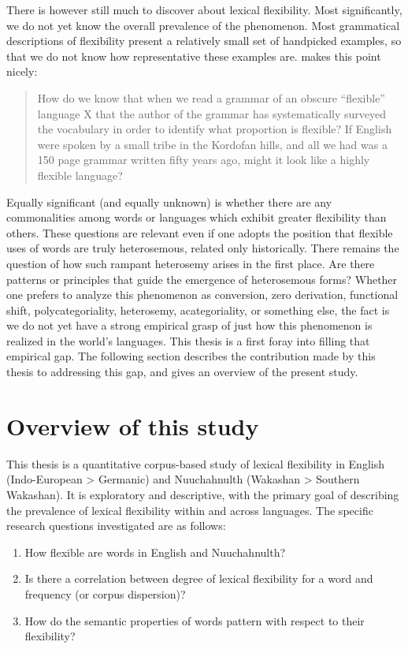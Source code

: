 There is however still much to discover about lexical flexibility. Most significantly, we do not yet know the overall prevalence of the phenomenon. Most grammatical descriptions of flexibility present a relatively small set of handpicked examples, so that we do not know how representative these examples are. \textcite[70]{Croft2001b} makes this point nicely:

\blockquote[{\cite[70]{Croft2001b}}]{How do we know that when we read a grammar of an obscure \enquote{flexible} language X that the author of the grammar has systematically surveyed the vocabulary in order to identify what proportion is flexible? If English were spoken by a small tribe in the Kordofan hills, and all we had was a 150 page grammar written fifty years ago, might it look like a highly flexible language?}

\noindent Equally significant (and equally unknown) is whether there are any commonalities among words or languages which exhibit greater flexibility than others. These questions are relevant even if one adopts the position that flexible uses of words are truly heterosemous, related only historically. There remains the question of how such rampant heterosemy arises in the first place. Are there patterns or principles that guide the emergence of heterosemous forms? Whether one prefers to analyze this phenomenon as conversion, zero derivation, functional shift, polycategoriality, heterosemy, acategoriality, or something else, the fact is we do not yet have a strong empirical grasp of just how this phenomenon is realized in the world's languages. This thesis is a first foray into filling that empirical gap. The following section describes the contribution made by this thesis to addressing this gap, and gives an overview of the present study.

\section{Overview of this study}
\label{sec:1.3}

This thesis is a quantitative corpus-based study of lexical flexibility in English (Indo-European > Germanic) and Nuuchahnulth (Wakashan > Southern Wakashan). It is exploratory and descriptive, with the primary goal of describing the prevalence of lexical flexibility within and across languages. The specific research questions investigated are as follows:

\begin{enumerate}[
  label      = {\textbf{R\arabic*:}},
  leftmargin = *,
  ref        = {R\arabic*}
]
  \item\label{R1} How flexible are words in English and Nuuchahnulth?
  \item\label{R2} Is there a correlation between degree of lexical flexibility for a word and frequency (or corpus dispersion)?
  \item\label{R3} How do the semantic properties of words pattern with respect to their flexibility?
\end{enumerate}

